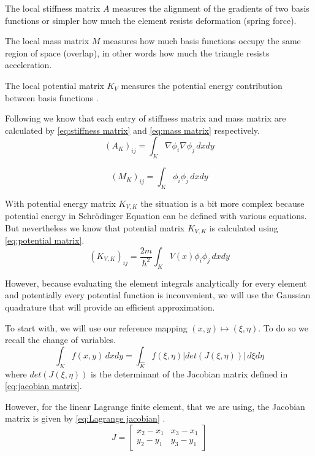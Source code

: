 \documentclass[acmsmall,screen]{MapleTrans}
\begin{document}
The local stiffness matrix $A$ measures the alignment of the gradients of two basis functions or simpler how much the element resists deformation (spring force). 

The local mass matrix $M$ measures how much basis functions occupy the same region of space (overlap), in other words how much the triangle resists acceleration.

The local potential matrix $K_V$ measures the potential energy contribution between basis functions \cite{b15}.

Following \cite{b10} we know that each entry of stiffness matrix and mass matrix are calculated by \eqref{eq:stiffness matrix} and \eqref{eq:mass matrix} respectively.
\begin{equation}
    (A_K)_{ij} = \int_K \nabla \phi_i \nabla \phi_j \, dxdy
    \label{eq:stiffness matrix}
\end{equation}

\begin{equation}
    (M_K)_{ij} = \int_K \phi_i \phi_j \, dxdy
    \label{eq:mass matrix}
\end{equation}

With potential energy matrix $K_{V,K}$ the situation is a bit more complex because potential energy in Schr\"{o}dinger Equation can be defined with various equations. But nevertheless we know that potential matrix $K_{V,K}$ is calculated using \eqref{eq:potential matrix}.
\begin{equation}
    (K_{V,K})_{ij} = \frac{2m}{\hbar^2}\int_K V(x) \phi_i \phi_j \, dxdy
    \label{eq:potential matrix}
\end{equation}

However, because evaluating the element integrals analytically for every element and potentially every potential function is inconvenient, we will use the Gaussian quadrature that will provide an efficient approximation.

To start with, we will use our reference mapping $(x, y) \mapsto (\xi, \eta)$. To do so we recall the change of variables.
\begin{equation}
    \int_K f(x, y) \, dxdy = \int_{\hat{K}}f(\xi, \eta) |det(J(\xi, \eta))| \, d\xi d\eta
    \label{eq:from physical to reference}
\end{equation}
where $det(J(\xi, \eta))$ is the determinant of the Jacobian matrix defined in \eqref{eq:jacobian matrix}.

However, for the linear Lagrange finite element, that we are using, the Jacobian matrix is given by \eqref{eq:Lagrange jacobian} \cite{b10}.
\begin{equation}
    J = \begin{bmatrix}
        x_2 - x_1 & x_3 - x_1 \\
        y_2 - y_1 & y_3 - y_1
    \end{bmatrix}
    \label{eq:Lagrange jacobian}
\end{equation}
\end{document}
